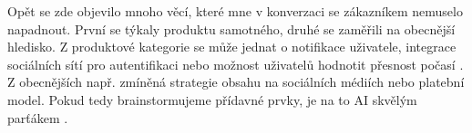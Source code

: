 \documentclass[FM,DP]{tulthesis}
\begin{document}
		Opět se zde objevilo mnoho věcí, které mne v konverzaci se zákazníkem nemuselo napadnout. První se týkaly produktu samotného, druhé se zaměřili na obecnější hledisko. Z produktové kategorie se může jednat o notifikace uživatele, integrace sociálních sítí pro autentifikaci nebo možnost uživatelů hodnotit přesnost počasí \cite{bard_analyza} \cite{chatgpt_analyza} \cite{codellama_analyza} \cite{gitCopilot_analyza} \cite{claude_analyza}. Z obecnějších např. zmíněná strategie obsahu na sociálních médiích nebo platební model. Pokud tedy brainstormujeme přídavné prvky, je na to AI skvělým parťákem \cite{bingCopilot_analyza} \cite{falcon_analyza}.
		
		
		
		
		
\end{document}

